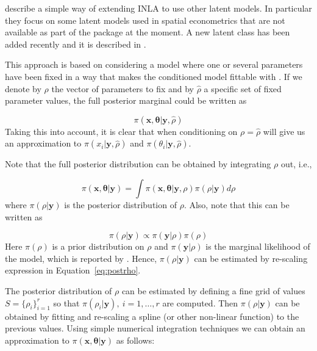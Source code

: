 \documentclass[article]{jss}
\begin{document}
\citet{Bivandetal:2014} describe a simple way of extending INLA to use other
latent models.  In particular they focus on some latent models used in spatial
econometrics that are not available as part of the  package at
the moment. A new latent class has been added recently and it is
described in \citet{GomezRubioetal:2014}.

This approach is based on considering a model where one or several parameters have been
fixed in a way that makes the conditioned model fittable with .  If
we denote by $\rho$ the vector of parameters to fix and by $\hat{\rho}$ a
specific set of fixed parameter values,  the full posterior marginal could be
written as


\begin{equation}
\pi(\mathbf{x}, \mathbf{\theta}|\mathbf{y}, \hat{\rho}) 
\end{equation}
\noindent
Taking this into account,  it is clear that when conditioning on
$\rho=\hat\rho$  will give us an approximation to
$\pi(x_i|\mathbf{y}, \hat{\rho})$ and $\pi(\theta_i|\mathbf{y}, \hat{\rho})$.



Note that the full posterior distribution can be obtained by integrating $\rho$
out, i.e.,

\begin{equation}
\pi(\mathbf{x}, \mathbf{\theta}|\mathbf{y}) = 
\int \pi(\mathbf{x}, \mathbf{\theta}|\mathbf{y}, \rho)\pi(\rho|\mathbf{y})d\rho
\label{eq:fullpost}
\end{equation}
\noindent
where $\pi(\rho|\mathbf{y})$ is the posterior distribution of $\rho$. Also,
note that this can be written as

\begin{equation}
\pi(\rho|\mathbf{y}) \propto \pi(\mathbf{y}|\rho) \pi(\rho)
\label{eq:postrho}
\end{equation}
\noindent
Here $\pi(\rho)$ is a prior distribution on $\rho$ and $\pi(\mathbf{y}|\rho)$
is the marginal likelihood of the model, which is reported by .
Hence, $\pi(\rho|\mathbf{y})$ can be estimated by re-scaling
expression in Equation~\ref{eq:postrho}.


The posterior distribution of $\rho$ can be estimated by defining a fine grid
of values $S=\{\rho_i\}_{i=1}^r$ so that $\pi(\rho_i|\mathbf{y}),\ i=1,
\ldots,r$ are computed.  Then $\pi(\rho|\mathbf{y})$ can be obtained by fitting
and re-scaling a spline (or other non-linear function) to the previous values.
Using simple numerical integration techniques we can obtain an approximation to
$\pi(\mathbf{x}, \mathbf{\theta}|\mathbf{y})$ as follows:
\end{document}

